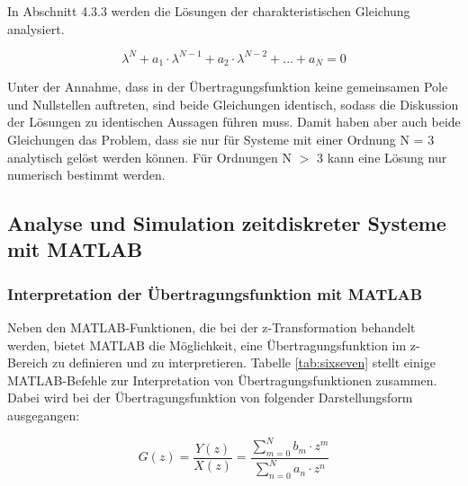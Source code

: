 \noindent In Abschnitt 4.3.3 werden die L\"{o}sungen der charakteristischen Gleichung analysiert.

\begin{equation}\label{eq:sixsonehundredtwentythree}
\lambda ^{N} +a_{1} \cdot \lambda ^{N-1} +a_{2} \cdot \lambda ^{N-2} +...+a_{N} =0
\end{equation}

\noindent Unter der Annahme, dass in der \"{U}bertragungsfunktion keine gemeinsamen Pole und Nullstellen auftreten, sind beide Gleichungen identisch, sodass die Diskussion der L\"{o}sungen zu identischen Aussagen f\"{u}hren muss. Damit haben aber auch beide Gleichungen das Problem, dass sie nur f\"{u}r Systeme mit einer Ordnung N = 3 analytisch gel\"{o}st werden k\"{o}nnen. F\"{u}r Ordnungen N $\mathrm{>}$ 3 kann eine L\"{o}sung nur numerisch bestimmt werden. 

\clearpage

\subsection{Analyse und Simulation zeitdiskreter Systeme mit MATLAB}

\subsubsection{Interpretation der \"{U}bertragungsfunktion mit MATLAB}

\noindent Neben den MATLAB-Funktionen, die bei der z-Transformation behandelt werden, bietet MATLAB die M\"{o}glichkeit, eine \"{U}bertragungsfunktion im z-Bereich zu definieren und zu interpretieren. Tabelle \ref{tab:sixseven} stellt einige MATLAB-Befehle zur Interpretation von \"{U}bertragungsfunktionen zusammen. Dabei wird bei der \"{U}bertragungsfunktion von folgender Darstellungsform ausgegangen:

\begin{equation}\label{eq:sixsonehundredtwentyfour}
G\left(z\right)=\frac{Y\left(z\right)}{X\left(z\right)} =\frac{\sum _{m=0}^{N}b_{m} \cdot z^{m}}{\sum _{n=0}^{N}a_{n} \cdot z^{n}}
\end{equation}

